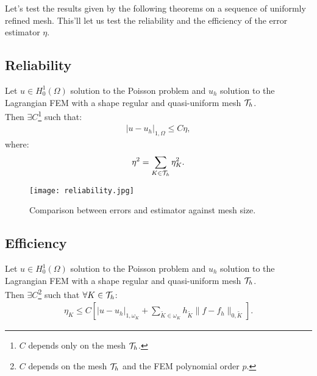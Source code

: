 Let's test the results given by the following theorems on a sequence of uniformly refined mesh. This'll let us test the reliability and the efficiency of the error estimator $\eta$.

\subsection{Reliability}

\begin{theorem}[Reliability]
	Let $u \in H_0^1(\Omega)$ solution to the Poisson problem and $u_h$ solution to the Lagrangian FEM with a shape regular and quasi-uniform mesh $\mathcal{T}_h$. \\
	Then $\exists C$\footnote{$C$ depends only on the mesh $\mathcal{T}_h$.} such that:
	\begin{gather}
		\lvert u - u_h \rvert_{1, \Omega} \leq C \eta,
	\end{gather}
	where:
	\begin{gather}
		\eta^2 = \sum_{K \in \mathcal{T}_h} \eta_K^2.
	\end{gather}
\end{theorem}

\begin{figure}[!ht]
	\centering
	\texttt{[image: reliability.jpg]}
	\caption{Comparison between errors and estimator against mesh size.}
\end{figure}

\newpage


\newpage
\subsection{Efficiency}

\begin{theorem}[Efficiency]
	Let $u \in H_0^1(\Omega)$ solution to the Poisson problem and $u_h$ solution to the Lagrangian FEM with a shape regular and quasi-uniform mesh $\mathcal{T}_h$. \\
	Then $\exists C$\footnote{$C$ depends on the mesh $\mathcal{T}_h$ and the FEM polynomial order $p$.} such that $\forall K \in \mathcal{T}_h$:
	\begin{gather}
		\eta_K \leq C \left[ \lvert u - u_h \rvert_{1, \omega_K} + \sum_{\tilde{K} \in \omega_K} h_{\tilde{K}} \lVert f - f_h \rVert_{0, \tilde{K}} \right].
	\end{gather}
\end{theorem}